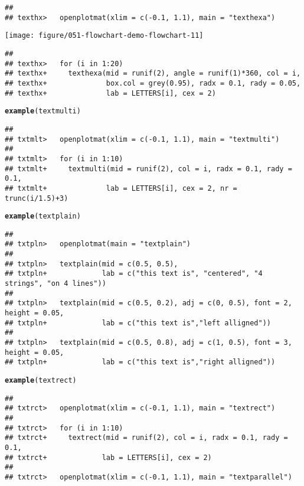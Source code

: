\documentclass{article}\usepackage[]{graphicx}\usepackage[]{xcolor}
\makeatletter
\def\maxwidth{ %
  \ifdim\Gin@nat@width>\linewidth
    \linewidth
  \else
    \Gin@nat@width
  \fi
}
\newcommand{\hldef}[1]{\textcolor[rgb]{0.345,0.345,0.345}{#1}}%
\newcommand{\hlkwd}[1]{\textcolor[rgb]{0.737,0.353,0.396}{\textbf{#1}}}%
\newenvironment{kframe}{%
 \def\at@end@of@kframe{}%
 \ifinner\ifhmode%
  \def\at@end@of@kframe{\end{minipage}}%
  \begin{minipage}{\columnwidth}%
 \fi\fi%
 \def\FrameCommand##1{\hskip\@totalleftmargin \hskip-\fboxsep
 \colorbox{shadecolor}{##1}\hskip-\fboxsep
     \hskip-\linewidth \hskip-\@totalleftmargin \hskip\columnwidth}%
 \MakeFramed {\advance\hsize-\width
   \@totalleftmargin\z@ \linewidth\hsize
   \@setminipage}}%
 {\par\unskip\endMakeFramed%
 \at@end@of@kframe}
\newenvironment{knitrout}{}{} %
\makeatother
\begin{document}
\begin{knitrout}
\begin{kframe}
\begin{alltt}
\end{alltt}
\begin{verbatim}
## 
## texthx>   openplotmat(xlim = c(-0.1, 1.1), main = "texthexa")
\end{verbatim}
\end{kframe}
\texttt{[image: figure/051-flowchart-demo-flowchart-11]} 
\begin{kframe}\begin{verbatim}
## 
## texthx>   for (i in 1:20) 
## texthx+     texthexa(mid = runif(2), angle = runif(1)*360, col = i,
## texthx+              box.col = grey(0.95), radx = 0.1, rady = 0.05,
## texthx+              lab = LETTERS[i], cex = 2)
\end{verbatim}
\begin{alltt}
\hlkwd{example}\hldef{(textmulti)}
\end{alltt}
\begin{verbatim}
## 
## txtmlt>   openplotmat(xlim = c(-0.1, 1.1), main = "textmulti")
## 
## txtmlt>   for (i in 1:10) 
## txtmlt+     textmulti(mid = runif(2), col = i, radx = 0.1, rady = 0.1,
## txtmlt+              lab = LETTERS[i], cex = 2, nr = trunc(i/1.5)+3)
\end{verbatim}
\begin{alltt}
\hlkwd{example}\hldef{(textplain)}
\end{alltt}
\begin{verbatim}
## 
## txtpln>   openplotmat(main = "textplain")
## 
## txtpln>   textplain(mid = c(0.5, 0.5), 
## txtpln+             lab = c("this text is", "centered", "4 strings", "on 4 lines"))
## 
## txtpln>   textplain(mid = c(0.5, 0.2), adj = c(0, 0.5), font = 2, height = 0.05,
## txtpln+             lab = c("this text is","left alligned"))
## 
## txtpln>   textplain(mid = c(0.5, 0.8), adj = c(1, 0.5), font = 3, height = 0.05, 
## txtpln+             lab = c("this text is","right alligned"))
\end{verbatim}
\begin{alltt}
\hlkwd{example}\hldef{(textrect)}
\end{alltt}
\begin{verbatim}
## 
## txtrct>   openplotmat(xlim = c(-0.1, 1.1), main = "textrect")
## 
## txtrct>   for (i in 1:10) 
## txtrct+     textrect(mid = runif(2), col = i, radx = 0.1, rady = 0.1,
## txtrct+             lab = LETTERS[i], cex = 2)
## 
## txtrct>   openplotmat(xlim = c(-0.1, 1.1), main = "textparallel")
\end{verbatim}
\end{kframe}

\end{knitrout}
\end{document}
